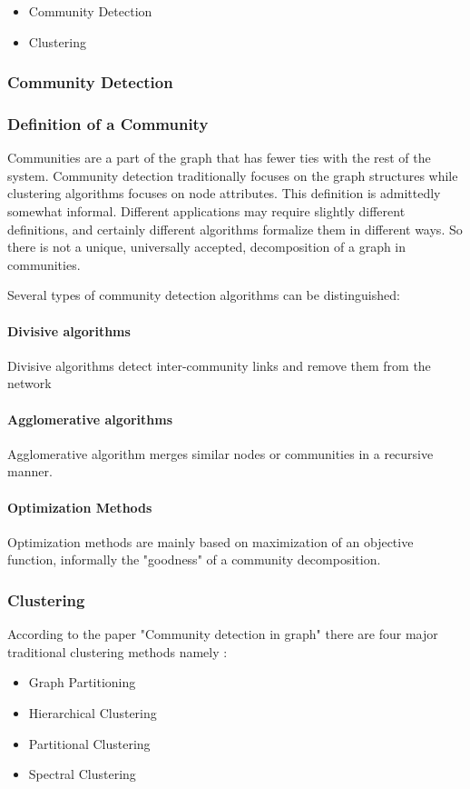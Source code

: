 \begin{itemize}
\item Community Detection
\item Clustering
\end{itemize}

\subsubsection{Community Detection}
\subsubsection{Definition of a Community}
Communities are a part of the graph that has fewer ties with the rest of the system. Community detection traditionally focuses on the graph structures while clustering algorithms focuses on node attributes. This definition is admittedly somewhat informal. Different applications may require slightly different definitions, and certainly different algorithms formalize them in different ways. So there is not a unique, universally accepted, decomposition of a graph in communities. 

Several types of community detection algorithms can be distinguished:
\paragraph{Divisive algorithms}
Divisive algorithms detect inter-community links and remove them from the network

\paragraph{Agglomerative algorithms}
Agglomerative algorithm merges similar nodes or communities in a recursive manner.

\paragraph{Optimization Methods}
Optimization methods are mainly based on maximization of an objective function, informally the "goodness" of a community decomposition. 

\subsubsection{Clustering}
According to the paper "Community detection in graph" \cite{communitypaper} there are four major traditional clustering methods namely : 
\begin{itemize}

\item Graph Partitioning 

\item Hierarchical Clustering

\item Partitional Clustering

\item Spectral Clustering

\end{itemize}

